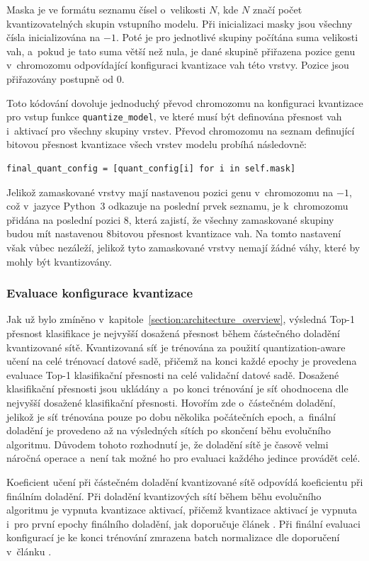 Maska je ve formátu seznamu čísel o~velikosti $N$, kde $N$ značí počet kvantizovatelných skupin vstupního modelu. Při inicializaci masky jsou všechny čísla inicializována na $-1$. Poté je pro jednotlivé skupiny počítána suma velikosti vah, a~pokud je tato suma větší než nula, je dané skupině přiřazena pozice genu v~chromozomu odpovídající konfiguraci kvantizace vah této vrstvy. Pozice jsou přiřazovány postupně od 0. 

Toto kódování dovoluje jednoduchý převod chromozomu na konfiguraci kvantizace pro vstup funkce \verb|quantize_model|, ve které musí být definována přesnost vah i~aktivací pro všechny skupiny vrstev. Převod chromozomu na seznam definující bitovou přesnost kvantizace všech vrstev modelu probíhá následovně:
\begin{lstlisting}
final_quant_config = [quant_config[i] for i in self.mask]
\end{lstlisting}
Jelikož zamaskované vrstvy mají nastavenou pozici genu v~chromozomu na $-1$, což v~jazyce Python~3 odkazuje na poslední prvek seznamu, je k~chromozomu přidána na poslední pozici $8$, která zajistí, že všechny zamaskované skupiny budou mít nastavenou 8bitovou přesnost kvantizace vah. Na tomto nastavení však vůbec nezáleží, jelikož tyto zamaskované vrstvy nemají žádné váhy, které by mohly být kvantizovány.

\subsubsection{Evaluace konfigurace kvantizace}

Jak už bylo zmíněno v~kapitole~\ref{section:architecture_overview}, výsledná Top-1 přesnost klasifikace je nejvyšší dosažená přesnost během částečného doladění kvantizované sítě. Kvantizovaná síť je trénována za použití quantization-aware učení na celé trénovací datové sadě, přičemž na konci každé epochy je provedena evaluace Top-1 klasifikační přesnosti na celé validační datové sadě. Dosažené klasifikační přesnosti jsou ukládány a~po konci trénování je síť ohodnocena dle nejvyšší dosažené klasifikační přesnosti. Hovořím zde o~částečném doladění, jelikož je síť trénována pouze po dobu několika počátečních epoch, a~finální doladění je provedeno až na výsledných sítích po skončení běhu evolučního algoritmu. Důvodem tohoto rozhodnutí je, že doladění sítě je časově velmi náročná operace a~není tak možné ho pro evaluaci každého jedince provádět celé.

Koeficient učení při částečném doladění kvantizované sítě odpovídá koeficientu při finálním doladění. Při doladění kvantizových sítí během běhu evolučního algoritmu je vypnuta kvantizace aktivací, přičemž kvantizace aktivací je vypnuta i~pro první epochy finálního doladění, jak doporučuje článek \cite{https://doi.org/10.48550/arxiv.1712.05877}. Při finální evaluaci konfigurací je ke konci trénování zmrazena batch normalizace dle doporučení v~článku \cite{krishnamoorthi2018quantizing}.

